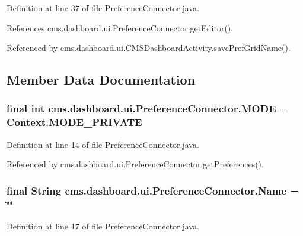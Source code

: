 \-Definition at line 37 of file \-Preference\-Connector.\-java.



\-References cms.\-dashboard.\-ui.\-Preference\-Connector.\-get\-Editor().



\-Referenced by cms.\-dashboard.\-ui.\-C\-M\-S\-Dashboard\-Activity.\-save\-Pref\-Grid\-Name().



\subsection{\-Member \-Data \-Documentation}
\subsubsection[{\-M\-O\-D\-E}]{\setlength{\rightskip}{0pt plus 5cm}final int {\bf cms.\-dashboard.\-ui.\-Preference\-Connector.\-M\-O\-D\-E} = \-Context.\-M\-O\-D\-E\-\_\-\-P\-R\-I\-V\-A\-T\-E\hspace{0.3cm}{\ttfamily  [static]}}\label{classcms_1_1dashboard_1_1ui_1_1_preference_connector_a688c7547bc76ff11a0167d4f6e554560}


\-Definition at line 14 of file \-Preference\-Connector.\-java.



\-Referenced by cms.\-dashboard.\-ui.\-Preference\-Connector.\-get\-Preferences().

\subsubsection[{\-Name}]{\setlength{\rightskip}{0pt plus 5cm}final \-String {\bf cms.\-dashboard.\-ui.\-Preference\-Connector.\-Name} = \char`\"{}\char`\"{}\hspace{0.3cm}{\ttfamily  [static]}}\label{classcms_1_1dashboard_1_1ui_1_1_preference_connector_aa1fa6312805fba439ec8c7e3a1b4f0c3}


\-Definition at line 17 of file \-Preference\-Connector.\-java.




